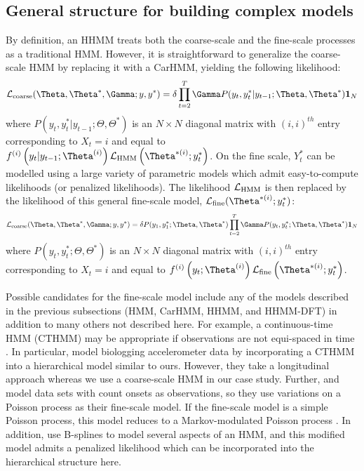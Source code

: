 
\subsection{General structure for building complex models}

By definition, an HHMM treats both the coarse-scale and the fine-scale processes as a traditional HMM. However, it is straightforward to generalize the coarse-scale HMM by replacing it with a CarHMM, yielding the following likelihood:
\[
\calL_{\text{coarse}}(\Theta,\Theta^*,\Gamma;y,y^*) = \delta \prod_{t=2}^T \Gamma P(y_t,y^*_t|y_{t-1};\Theta,\Theta^*) \mathbf{1}_N
\]
where $P(y_t,y^*_t|y_{t-1};\Theta,\Theta^*) $ is an $N \times N$ diagonal matrix with $(i,i)^{th}$ entry corresponding to $X_t=i$ and equal to $f^{(i)}\left(y_t|y_{t-1};\Theta^{(i)}\right)\calL_{\text{HMM}}\left(\Theta^{*(i)};y^*_t\right)$. 
On the fine scale, $Y^*_t$ can be modelled using a large variety of parametric models which admit easy-to-compute likelihoods (or penalized likelihoods). The likelihood $\mathcal{L}_{\text{HMM}}$ is then replaced by the likelihood of this general fine-scale model, $\calL_{\text{fine}}(\Theta^{*(i)};y^*_t)$:
\[
\calL_{\text{coarse}}(\Theta,\Theta^*,\Gamma;y,y^*) = \delta P(y_1,y^*_1;\Theta,\Theta^*) \prod_{t=2}^T \Gamma P(y_t,y^*_t;\Theta,\Theta^*) \mathbf{1}_N
\]
where $P(y_t,y^*_t;\Theta,\Theta^*) $ is an $N \times N$ diagonal matrix with $(i,i)^{th}$ entry corresponding to $X_t=i$ and equal to $f^{(i)}\left(y_t;\Theta^{(i)}\right)\calL_{\text{fine}}\left(\Theta^{*(i)};y^*_t\right)$. 

Possible candidates for the fine-scale model include any of the models described in the previous subsections (HMM, CarHMM, HHMM, and HHMM-DFT) in addition to many others not described here. 
For example, a continuous-time HMM (CTHMM) may be appropriate if observations are not equi-spaced in time \citep{Liu:2015}. In particular, \citet{Xu:2018} model biologging accelerometer data by incorporating a CTHMM into a hierarchical model similar to ours. However, they take a longitudinal approach whereas we use a coarse-scale HMM in our case study.
Further, \citet{Bebbington:2007} and \citet{Borchers:2013} model data sets with count onsets as observations, so they use variations on a Poisson process as their fine-scale model. If the fine-scale model is a simple Poisson process, this model reduces to a Markov-modulated Poisson process \citep{Fischer:1993}.
In addition, \citep{Langrock:2018} use B-splines to model several aspects of an HMM, and this modified model admits a penalized likelihood which can be incorporated into the hierarchical structure here. 

